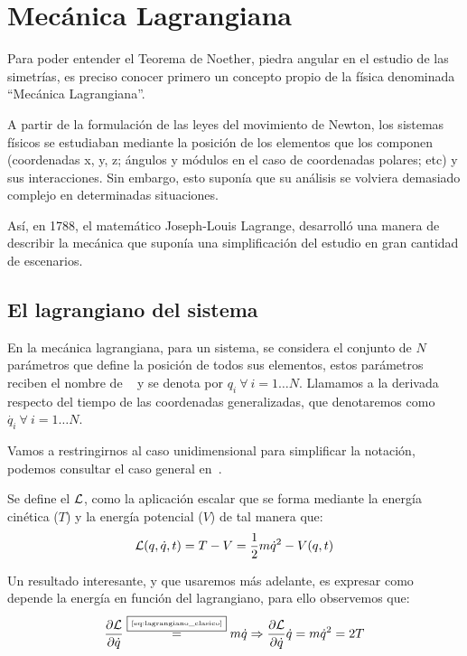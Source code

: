 \chapter{Mecánica Lagrangiana}\label{ch:mecanica-lagrangiana}
Para poder entender el Teorema de Noether, piedra angular en el estudio de las simetrías, es preciso conocer primero un concepto propio de la física denominada ``Mecánica Lagrangiana''.

A partir de la formulación de las leyes del movimiento de Newton, los sistemas físicos se estudiaban mediante la posición de los elementos que los componen (coordenadas x, y, z; ángulos y módulos en el caso de coordenadas polares; etc) y sus interacciones.
Sin embargo, esto suponía que su análisis se volviera demasiado complejo en determinadas situaciones.

Así, en 1788, el matemático Joseph-Louis Lagrange, desarrolló una manera de describir la mecánica que suponía una simplificación del estudio en gran cantidad de escenarios.

\section{El lagrangiano del sistema}\label{sec:el-lagrangiano-del-sistema}
En la mecánica lagrangiana, para un sistema, se considera el conjunto de $N$ parámetros que define la posición de todos sus elementos, estos parámetros reciben el nombre de ~\cite{GTP} y se denota por $q_i\ \forall\ i=1\dots N$.
Llamamos  a la derivada respecto del tiempo de las coordenadas generalizadas, que denotaremos como $\dot{q_i}\ \forall\ i=1\dots N$.

Vamos a restringirnos al caso unidimensional para simplificar la notación, podemos consultar el caso general en~\cite{Goldstein}.

Se define el  $\mathcal{L}$, como la aplicación escalar que se forma mediante la energía cinética ($T$) y la energía potencial ($V$) de tal manera que:
\begin{equation}
	\label{eq:lagrangiano_clasico}
	\mathcal{L}(q,\dot{q},t)=T-V=\frac{1}{2}m\dot{q}^2-V(q,t)
\end{equation}

Un resultado interesante, y que usaremos más adelante, es expresar como depende la energía en función del lagrangiano, para ello observemos que:
\begin{equation*}
	\frac{\partial\mathcal{L}}{\partial\dot{q}}\overset{\fbox{\tiny \ref{eq:lagrangiano_clasico}}}{=}m\dot{q}\Rightarrow \frac{\partial\mathcal{L}}{\partial\dot{q}}\dot{q} =m\dot{q}^2 = 2T
\end{equation*}

